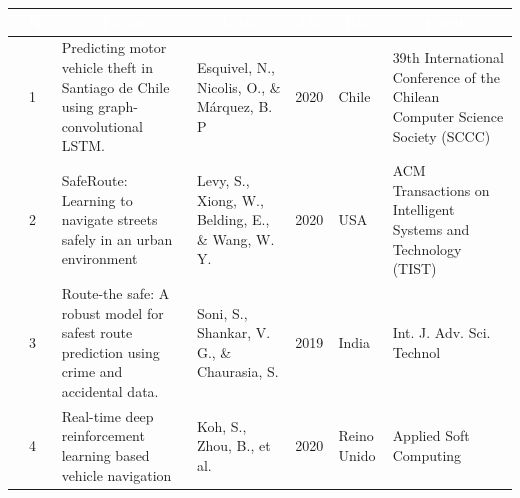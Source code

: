 \begin{table}[h]
	\newcommand{\multirot}[1]{\multirow{2}{*}[-8ex]{\rotcell{\rlap{#1}}}}
	\footnotesize
	\centering
	\begin{tabular}{|m{0.5cm}|m{0.3cm}|m{4cm}|m{2cm}|m{0.6cm}|m{1.7cm}|m{3cm}|} 
		\hline
		\rowcolor[rgb]{0,0.251,0.502} \multicolumn{1}{|c|}{\textcolor{white}{Tipo}} & \multicolumn{1}{c|}{\textcolor{white}{N°}} & \multicolumn{1}{c|}{\textcolor{white}{Título}}                                                                             & \multicolumn{1}{c|}{\textcolor{white}{Autor}}        & \multicolumn{1}{c|}{\textcolor{white}{Año}} & \multicolumn{1}{c|}{\textcolor{white}{País}} & \multicolumn{1}{c|}{\textcolor{white}{Fuente}}                                                        \\ 
		\hline
		\multirot{Problema}                                        & 1                                             &Predicting motor vehicle theft in Santiago de Chile using graph-convolutional LSTM.                                                                               & Esquivel, N., Nicolis, O., \& Márquez, B. P                                 & 2020                                      & Chile                               & 39th International Conference of the Chilean Computer Science Society (SCCC)                                                                                      \\ 
		\cline{2-7}
		& 2                                             & SafeRoute: Learning to navigate streets safely in an urban environment                                                            & Levy, S., Xiong, W., Belding, E., \& Wang, W. Y.                     & 2020                                        & USA                                  &ACM Transactions on Intelligent Systems and Technology (TIST)                                                \\ 
		\hline
		\multirow{2}{*}[-14ex]{\rotcell{\rlap{Propuesta}}}
		& 3                                             & Route-the safe: A robust model for safest route prediction using crime and accidental data.                           & Soni, S., Shankar, V. G., \& Chaurasia, S.                             & 2019                                        & India                                          & Int. J. Adv. Sci. Technol                                                                    \\ 
		\cline{2-7}
		& 4                                             & Real-time deep reinforcement learning based vehicle navigation                                                                                & Koh, S., Zhou, B., et al.                                          & 2020                                        & Reino Unido                                          & Applied Soft Computing                                                             \\ 

\end{tabular}
\end{table}
